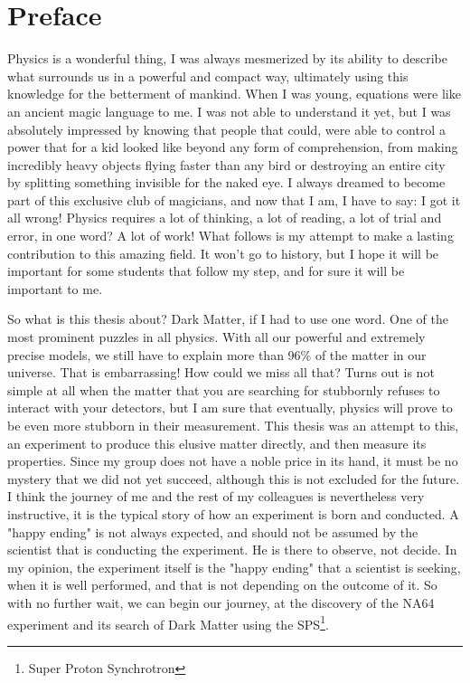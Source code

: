 \chapter*{Preface}
\label{preface}

Physics is a wonderful thing, I was always mesmerized by its ability to describe what surrounds us in a powerful and compact way, ultimately using this knowledge for the betterment of mankind. When I was young, equations were like an ancient magic language to me. I was not able to understand it yet, but I was absolutely impressed by knowing that people that could, were able to control a power that for a kid looked like beyond any form of comprehension, from making incredibly heavy objects flying faster than any bird or destroying an entire city by splitting something invisible for the naked eye. I always dreamed to become part of this exclusive club of magicians, and now that I am, I have to say: I got it all wrong! Physics requires a lot of thinking, a lot of reading, a lot of trial and error, in one word? A lot of work! What follows is my attempt to make a lasting contribution to this amazing field. It won't go to history, but I hope it will be important for some students that follow my step, and for sure it will be important to me.

So what is this thesis about? Dark Matter, if I had to use one word. One of the most prominent puzzles in all physics. With all our powerful and extremely precise models, we still have to explain more than 96\% of the matter in our universe. That is embarrassing! How could we miss all that? Turns out is not simple at all when the matter that you are searching for stubbornly refuses to interact with your detectors, but I am sure that eventually, physics will prove to be even more stubborn in their measurement. This thesis was an attempt to this, an experiment to produce this elusive matter directly, and then measure its properties. Since my group does not have a noble price in its hand, it must be no mystery that we did not yet succeed, although this is not excluded for the future. I think the journey of me and the rest of my colleagues is nevertheless very instructive, it is the typical story of how an experiment is born and conducted. A "happy ending" is not always expected, and should not be assumed by the scientist that is conducting the experiment. He is there to observe, not decide. In my opinion, the experiment itself is the "happy ending" that a scientist is seeking, when it is well performed, and that is not depending on the outcome of it. So with no further wait, we can begin our journey, at the discovery of the NA64 experiment and its search of Dark Matter using the SPS\footnote{Super Proton Synchrotron}.

